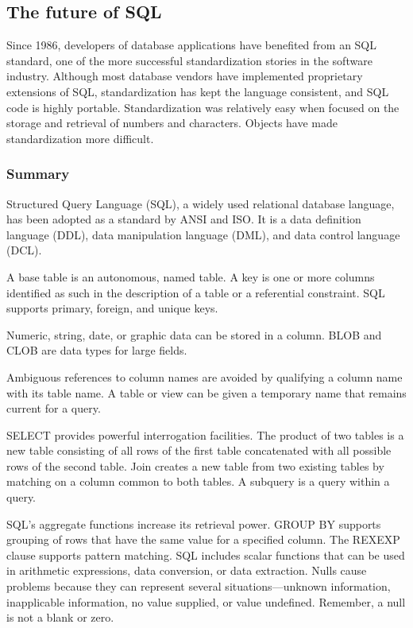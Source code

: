 \documentclass[
]{article}
\begin{document}
\hypertarget{the-future-of-sql}{%
\subsection*{The future of SQL}\label{the-future-of-sql}}

Since 1986, developers of database applications have benefited from an
SQL standard, one of the more successful standardization stories in the
software industry. Although most database vendors have implemented
proprietary extensions of SQL, standardization has kept the language
consistent, and SQL code is highly portable. Standardization was
relatively easy when focused on the storage and retrieval of numbers and
characters. Objects have made standardization more difficult.

\hypertarget{summary-3}{%
\subsubsection*{Summary}\label{summary-3}}

Structured Query Language (SQL), a widely used relational database
language, has been adopted as a standard by ANSI and ISO. It is a data
definition language (DDL), data manipulation language (DML), and data
control language (DCL).

A base table is an autonomous, named table. A key is one or more columns
identified as such in the description of a table or a referential
constraint. SQL supports primary, foreign, and unique keys.

Numeric, string, date, or graphic data can be stored in a column. BLOB
and CLOB are data types for large fields.

Ambiguous references to column names are avoided by qualifying a column
name with its table name. A table or view can be given a temporary name
that remains current for a query.

SELECT provides powerful interrogation facilities. The product of two
tables is a new table consisting of all rows of the first table
concatenated with all possible rows of the second table. Join creates a
new table from two existing tables by matching on a column common to
both tables. A subquery is a query within a query.

SQL's aggregate functions increase its retrieval power. GROUP BY
supports grouping of rows that have the same value for a specified
column. The REXEXP clause supports pattern matching. SQL includes scalar
functions that can be used in arithmetic expressions, data conversion,
or data extraction. Nulls cause problems because they can represent
several situations---unknown information, inapplicable information, no
value supplied, or value undefined. Remember, a null is not a blank or
zero.
\end{document}
